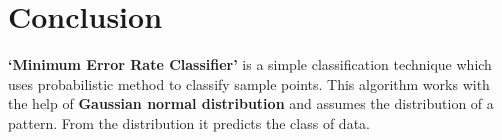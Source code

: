 \documentclass[conference]{IEEEtran}
\begin{document}
\section{Conclusion}

\textbf{‘Minimum Error Rate Classifier’} is a simple classification technique which uses probabilistic method to classify sample points. This algorithm works with the help of \textbf{Gaussian normal distribution} and assumes the distribution of a pattern. From the distribution it predicts the class of data.
\end{document}
